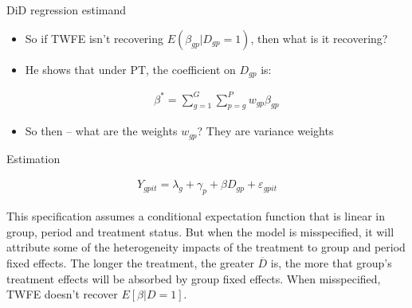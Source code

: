 \documentclass{beamer}
\begin{document}
\begin{frame}{DiD regression estimand}

\begin{itemize}
\item So if TWFE isn't recovering $E(\beta_{gp} | D_{gp} = 1)$, then what is it recovering?
\item He shows that under PT, the coefficient on $D_{gp}$ is:

\begin{eqnarray*}
\beta^* = \sum_{g=1}^G \sum_{p=g}^P w_{gp}\beta_{gp}
\end{eqnarray*}

\item So then -- what are the weights $w_{gp}$?  They are variance weights 
\end{itemize}

\end{frame}







\begin{frame}{Estimation}

\begin{eqnarray*}
Y_{gpit} = \lambda_g + \gamma_p + \beta D_{gp} + \varepsilon_{gpit}
\end{eqnarray*}

\bigskip

This specification assumes a conditional expectation function that is linear in group, period and treatment status.  But when the model is misspecified, it will attribute some of the heterogeneity impacts of the treatment to group and period fixed effects.  The longer the treatment, the greater $\overline{D}$ is, the more that group's treatment effects will be absorbed by group fixed effects.  When misspecified, TWFE doesn't recover $E[\beta | D=1]$.

\end{frame}
\end{document}
